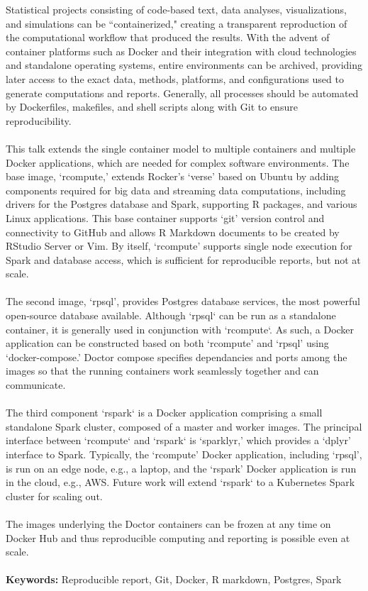 Statistical projects consisting of code-based text, data analyses, visualizations, and simulations can be ``containerized," creating a transparent reproduction of the computational workflow that produced the results. With the advent of container platforms such as Docker and their integration with cloud technologies and standalone operating systems, entire environments can be archived, providing later access to the exact data, methods, platforms, and configurations used to generate computations and reports. Generally, all processes should be automated by Dockerfiles, makefiles, and shell scripts along with Git to ensure reproducibility.\\
\\
This talk extends the single container model to multiple containers and multiple Docker applications, which are needed for complex software environments. The base image, `rcompute,' extends Rocker's `verse' based on Ubuntu by adding components required for big data and streaming data computations, including drivers for the Postgres database and Spark, supporting R packages, and various Linux applications. This base container supports `git' version control and connectivity to GitHub and allows R Markdown documents to be created by RStudio Server or Vim. By itself, `rcompute' supports single node execution for Spark and database access, which is sufficient for reproducible reports, but not at scale.\\
\\
The second image, `rpsql', provides Postgres database services, the most powerful open-source database available. Although `rpsql` can be run as a standalone container, it is generally used in conjunction with `rcompute`. As such, a Docker application can be constructed based on both `rcompute' and `rpsql' using `docker-compose.' Doctor compose specifies dependancies and ports among the images so that the running containers work seamlessly together and can communicate.\\
\\
The third component `rspark` is a Docker application comprising a small standalone Spark cluster, composed of a master and worker images. The principal interface between `rcompute` and `rspark` is `sparklyr,' which provides a `dplyr' interface to Spark. Typically, the `rcompute' Docker application, including `rpsql', is run on an edge node, e.g., a laptop, and the `rspark' Docker application is run in the cloud, e.g., AWS. Future work will extend `rspark` to a Kubernetes Spark cluster for scaling out.\\
\\
The images underlying the Doctor containers can be frozen at any time on Docker Hub and thus reproducible computing and reporting is possible even at scale.\\
\\
\textbf{Keywords:} Reproducible report, Git, Docker, R markdown, Postgres, Spark


